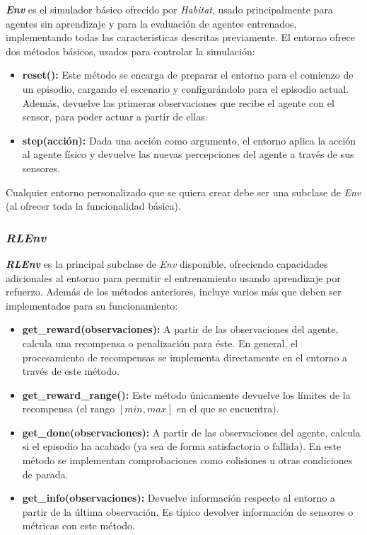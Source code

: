 \textbf{\textit{Env}} es el simulador básico ofrecido por \textit{Habitat}, usado principalmente para agentes sin aprendizaje y para la evaluación de agentes entrenados, implementando todas las características descritas previamente. El entorno ofrece dos métodos básicos, usados para controlar la simulación:

\begin{itemize}
	\item \textbf{reset():} Este método se encarga de preparar el entorno para el comienzo de un episodio, cargando el escenario y configurándolo para el episodio actual. Además, devuelve las primeras observaciones que recibe el agente con el sensor, para poder actuar a partir de ellas.
	\item \textbf{step(acción):} Dada una acción como argumento, el entorno aplica la acción al agente físico y devuelve las nuevas percepciones del agente a través de sus sensores.
\end{itemize}

Cualquier entorno personalizado que se quiera crear debe ser una subclase de \textit{Env} (al ofrecer toda la funcionalidad básica).

\subsubsection{\textit{RLEnv}}

\textbf{\textit{RLEnv}} es la principal subclase de \textit{Env} disponible, ofreciendo capacidades adicionales al entorno para permitir el entrenamiento usando aprendizaje por refuerzo. Además de los métodos anteriores, incluye varios más que deben ser implementados para su funcionamiento:

\begin{itemize}
	\item \textbf{get{\_}reward(observaciones):} A partir de las observaciones del agente, calcula una recompensa o penalización para éste. En general, el procesamiento de recompensas se implementa directamente en el entorno a través de este método.
	
	\item \textbf{get{\_}reward{\_}range():} Este método únicamente devuelve los límites de la recompensa (el rango $[min, max]$ en el que se encuentra).
	
	\item \textbf{get{\_}done(observaciones):} A partir de las observaciones del agente, calcula si el episodio ha acabado (ya sea de forma satisfactoria o fallida). En este método se implementan comprobaciones como colisiones u otras condiciones de parada.
	
	\item \textbf{get{\_}info(observaciones):} Devuelve información respecto al entorno a partir de la última observación. Es típico devolver información de sensores o métricas con este método. 
\end{itemize}


